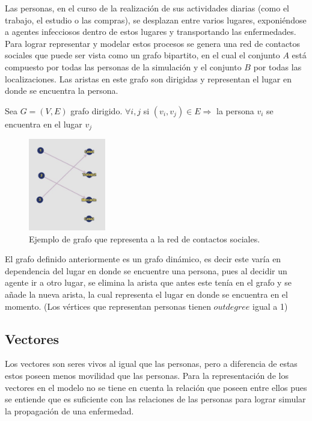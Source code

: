 Las personas, en el curso de la realización de sus actividades diarias (como el trabajo, el estudio o las compras),
se desplazan entre varios lugares, exponiéndose a agentes infecciosos dentro de estos lugares y transportando las
enfermedades. Para lograr representar y modelar estos procesos se genera una red de contactos sociales que puede
ser vista como un grafo bipartito, en el cual el conjunto $A$ está compuesto por todas las personas de la simulación
y el conjunto $B$ por todas las localizaciones. Las aristas en este grafo son dirigidas y representan 
el lugar en donde se encuentra la persona.\\
\begin{center}
    Sea $G = (V,E)$ grafo dirigido. 
    $\forall i,j$ si $(v_i,v_j) \in E \Rightarrow$ la persona $v_i$ se encuentra en el lugar $v_j$ 
\end{center}


\begin{figure}[htb]
    \centering
    \includegraphics[width=0.3\textwidth]{Graphics/Grafo_Loc_Pers.jpeg}
    \caption{Ejemplo de grafo que representa a la red de contactos sociales.}
\end{figure}

El grafo definido anteriormente es un grafo dinámico, es decir este varía en dependencia del lugar en donde se encuentre
una persona, pues al decidir un agente ir a otro lugar, se elimina la arista que antes este tenía en el grafo y se 
añade la nueva arista, la cual representa el lugar en donde se encuentra en el momento. (Los vértices que representan
personas tienen $outdegree$ igual a 1)\\

\subsection{Vectores}
Los vectores son seres vivos al igual que las personas, pero a diferencia de estas estos poseen menos movilidad que las
personas. Para la representación de los vectores en el modelo no se tiene en cuenta la relación que 
poseen entre ellos pues se entiende que es suficiente con las relaciones de las personas para lograr simular 
la propagación de una enfermedad.\\ 

